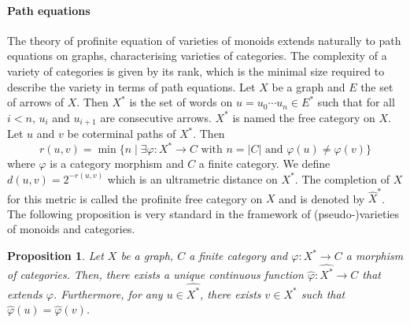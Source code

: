 \documentclass[submission,hidelink]{dmtcs-episciences}
\newtheorem{proposition}[theorem]{Proposition}
\begin{document}
\paragraph{Path equations}
The theory of profinite equation of varieties of monoids extends naturally to path equations on graphs,
		characterising varieties of categories.
The complexity of a variety of categories is given by its rank,
		which is the minimal size required to describe the variety in terms of path equations.
Let $X$ be a graph and $E$ the set of arrows of $X$. Then $X^*$
			is the set of words on $u=u_0\cdots u_n\in E^*$ such that for all
			$i<n$, $u_i$ and $u_{i+1}$ are consecutive arrows.
			$X^*$ is named the free category on $X$.
Let $u$ and $v$ be coterminal paths of $X^*$. Then
			$$r(u,v)=\min{\big\{n\mid \exists \varphi:X^*\to C\text{ with }n=|C|\text{ and }\varphi(u)\neq \varphi(v)\big\}}$$
			where $\varphi$ is a category morphism and $C$ a finite category.
			We define $d(u,v)=2^{-r(u,v)}$ which is an ultrametric distance  on $X^*$.
			The completion of $X$ for this metric is called the profinite free category on $X$ and is denoted by $\widehat{X}^*$.
			The following proposition is very standard in the framework of (pseudo-)varieties of monoids and categories.
\begin{proposition}
			Let $X$ be a graph, $C$ a finite category and $\varphi:X^*\to C$ a morphism of categories.
			Then, there exists a unique continuous function $\widehat{\varphi}:\widehat{X^*} \to C$ that extends $\varphi$.
			Furthermore, for any $u\in \widehat{X^*}$, there exists $v\in X^*$ such that $\widehat\varphi(u) = \widehat\varphi(v)$.
		\end{proposition}
\end{document}
